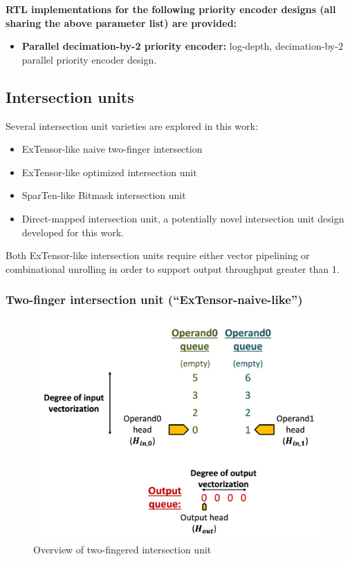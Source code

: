 \textbf{RTL implementations for the following priority encoder designs (all sharing the above parameter list) are provided:}

\begin{itemize}
    \item \textbf{Parallel decimation-by-2 priority encoder\cite{recursive_priority_encoder}:} log-depth, decimation-by-2 parallel priority encoder design.
\end{itemize}

\subsection{Intersection units}

Several intersection unit varieties are explored in this work:

\begin{itemize}
    \item ExTensor-like\cite{extensor} naive two-finger intersection
    \item ExTensor-like\cite{extensor} optimized intersection unit
    \item SparTen-like\cite{sparten} Bitmask intersection unit
    \item Direct-mapped intersection unit, a potentially novel intersection unit design developed for this work.
\end{itemize}

Both ExTensor-like intersection units require either vector pipelining or combinational unrolling in order to support output throughput greater than 1.

\subsubsection{Two-finger intersection unit (``ExTensor-naive-like'')}

\begin{figure}[H]
    \centering
    \includegraphics[width=\linewidth]{figures/radix2_intersect_overview.png}
    \caption{Overview of two-fingered intersection unit}
    \label{fig:radix2-overview}
\end{figure}

